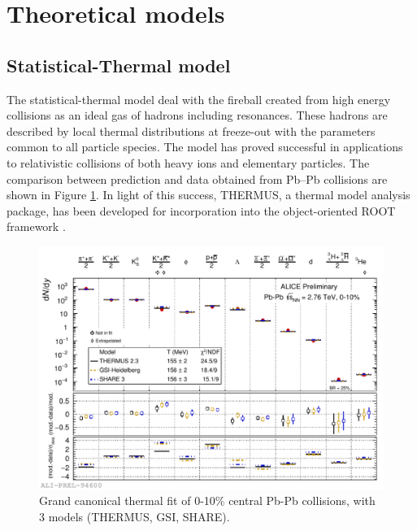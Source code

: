 \section{Theoretical models}\label{sec:model}
\subsection{Statistical-Thermal  model}\label{sec:thermalmodel}

The statistical-thermal model deal with the fireball created from high energy collisions as an ideal gas of hadrons including resonances. These hadrons are described by local thermal distributions at freeze-out with the parameters common to all particle species. The model has proved successful in applications to relativistic collisions of both heavy ions and elementary particles. The comparison between prediction and data obtained from Pb--Pb collisions are shown in Figure \ref{fig:thermal}. In light of this success, THERMUS, a thermal model analysis package, has been developed for incorporation into the object-oriented ROOT framework \cite{Wheaton:2004qb}.\\ 

\begin{figure}[htbp]
\begin{center}
\includegraphics[width=14.cm]{./Version1/FigChapter2/ThermalModel}
\caption{Grand canonical thermal fit of 0-10\% central Pb-Pb collisions, with 3 models (THERMUS, GSI, SHARE). %
}
\label{fig:thermal}
\end{center}
\end{figure}


